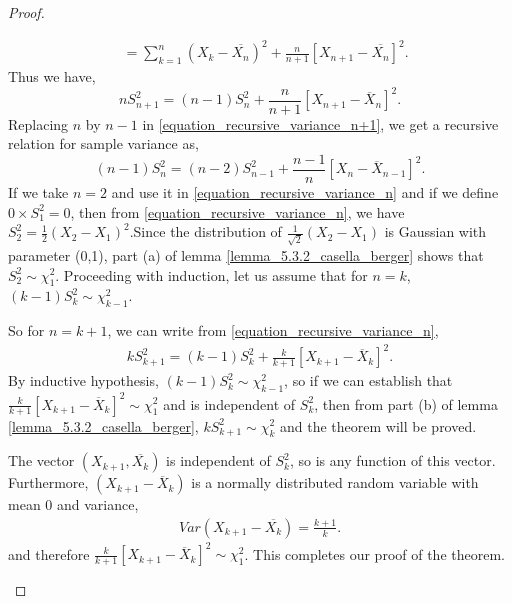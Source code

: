\documentclass[a4paper,english,12pt]{article}
\begin{document}
\begin{proof}
\begin{enumerate}
\begin{align}
& =\sum\limits_{k=1}^{n} (X_{k}-\overline{X_n})^2+\frac{n}{n+1}[X_{n+1} - \overline{X_n}]^2.
\end{align}
Thus we have,
\begin{equation} \label{equation_recursive_variance_n+1}
nS_{n+1} ^2=(n-1)S_{n} ^2+\frac{n}{n+1}[X_{n+1} - \overline{X}_n]^2.
\end{equation}
Replacing $n$ by $n-1$ in \eqref{equation_recursive_variance_n+1}, we get a recursive relation for sample variance as,
\begin{equation} \label{equation_recursive_variance_n}
(n-1)S_{n} ^2=(n-2)S_{n-1} ^2+\frac{n-1}{n}[X_{n} - \overline{X}_{n-1}]^2.
\end{equation} 
If we take $n=2$ and use it in \eqref{equation_recursive_variance_n} and if we define $0\times S_1 ^2=0$, then from \eqref{equation_recursive_variance_n}, we have $S_2^2=\frac{1}{2}(X_2-X_1)^2$.Since the distribution of $\frac{1}{\sqrt{2}}(X_2-X_1)$ is Gaussian with parameter (0,1), part (a) of lemma  \ref{lemma_5.3.2_casella_berger} shows that $S_2 ^2 \sim \chi_1 ^2$. Proceeding with induction, let us assume that for $n=k$, $(k-1)S_k ^2 \sim \chi_{k-1} ^2$.
\par So for $n=k+1$, we can write from \eqref{equation_recursive_variance_n},
\begin{align}
kS_{k+1} ^2=(k-1)S_{k} ^2+\frac{k}{k+1}[X_{k+1} - \overline{X}_k]^2.
\end{align}
By inductive hypothesis, $(k-1)S_k ^2 \sim \chi_{k-1} ^2$, so if we can establish that $\frac{k}{k+1}\left[X_{k+1} - \overline{X}_k\right]^2\sim \chi_{1} ^2$ and is independent of $S_k ^2$, then from part (b) of lemma \ref{lemma_5.3.2_casella_berger}, $kS_{k+1} ^2\sim \chi_k ^2$ and the theorem will be proved. 
\par The vector $(X_{k+1},\overline{X_k})$ is independent of $S_k ^2$, so is any function of this vector. Furthermore, $(X_{k+1} - \overline{X}_k)$ is a normally distributed random variable with mean $0$ and variance,
\begin{align}
Var(X_{k+1} - \overline{X_k})=\frac{k+1}{k}. \nonumber
\end{align}
and therefore $\frac{k}{k+1}\left[X_{k+1} - \overline{X}_k\right]^2\sim \chi_{1} ^2$. This completes our proof of the theorem.
\end{enumerate}
\end{proof}
\end{document}
